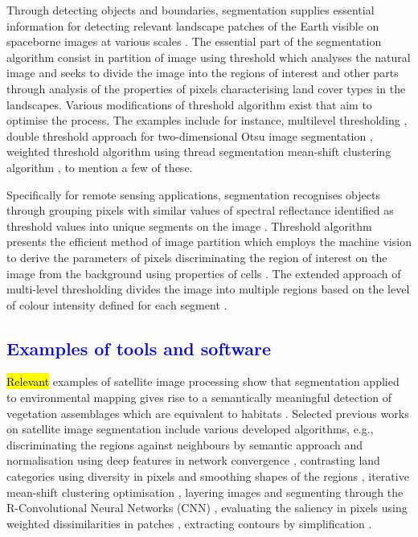 \documentclass[analytics,article,submit,pdftex,moreauthors]{Definitions/mdpi}
\begin{document}
Through detecting objects and boundaries, segmentation supplies essential information for detecting relevant landscape patches of the Earth visible on spaceborne images at various scales \cite{Tzotsos}. The essential part of the segmentation algorithm consist in partition of image using threshold which analyses the natural image and seeks to divide the image into the regions of interest and other parts through analysis of the properties of pixels characterising land cover types in the landscapes. Various modifications of threshold algorithm exist that aim to optimise the process. The examples include for instance, multilevel thresholding \cite{9983775,8304271,8633236}, double threshold approach for two-dimensional Otsu image segmentation \cite{9421654,6066573}, weighted threshold algorithm using thread segmentation \cite{7493998} mean-shift clustering algorithm \cite{BARBATO2022100823}, to mention a few of these.

Specifically for remote sensing applications, segmentation recognises objects through grouping pixels with similar values of spectral reflectance identified as threshold values into unique segments on the image \cite{PAL20229964}. Threshold algorithm presents the efficient method of image partition which employs the machine vision to derive the parameters of pixels discriminating the region of interest on the image from the background using properties of cells \cite{6100288}. The extended approach of multi-level thresholding divides the image into multiple regions based on the level of colour intensity defined for each segment \cite{9244772,5721309,6755644}.

\subsection{\textcolor{blue}{Examples of tools and software}}

\hl{Relevant} examples of satellite image processing show that segmentation applied to environmental mapping gives rise to a semantically meaningful detection of vegetation assemblages which are equivalent to habitats \cite{MUNYATI20131}. Selected previous works on satellite image segmentation include various developed algorithms, e.g., discriminating the regions against neighbours by semantic approach and normalisation using deep features in network convergence \cite{WANG2023108734}, contrasting land categories using diversity in pixels and smoothing shapes of the regions \cite{MAURYA2023102078}, iterative mean-shift clustering optimisation \cite{6351712}, layering images and segmenting through the R-Convolutional Neural Networks (CNN) \cite{8519391}, evaluating the saliency in pixels using weighted dissimilarities in patches \cite{6727739}, extracting contours by simplification \cite{WU20151133,8630683}. 
\end{document}
